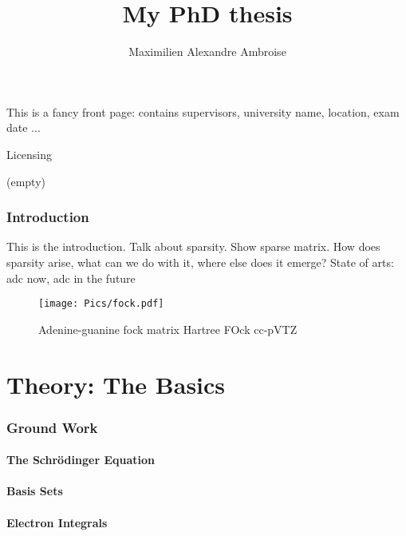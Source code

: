 \documentclass[a4paper,12pt]{article}
\begin{document}
\author{Maximilien Alexandre Ambroise}
\title{My PhD thesis}

\maketitle

This is a fancy front page: contains supervisors, university name, location, exam date ...

\newpage

Licensing

\newpage

(empty)

\newpage

\tableofcontents

\newpage

\section{Introduction}

This is the introduction. Talk about sparsity. Show sparse matrix. How does sparsity arise, what can we do with it, where else does it emerge?
State of arts: adc now, adc in the future

\begin{figure}
\centering
\texttt{[image: Pics/fock.pdf]}
\caption{Adenine-guanine fock matrix Hartree FOck cc-pVTZ}
\label{SparseExample}
\end{figure}

\newpage

\part{Theory: The Basics}

\section{Ground Work}

\subsection{The Schrödinger Equation}

\subsection{Basis Sets}

\subsection{Electron Integrals}
\end{document}
